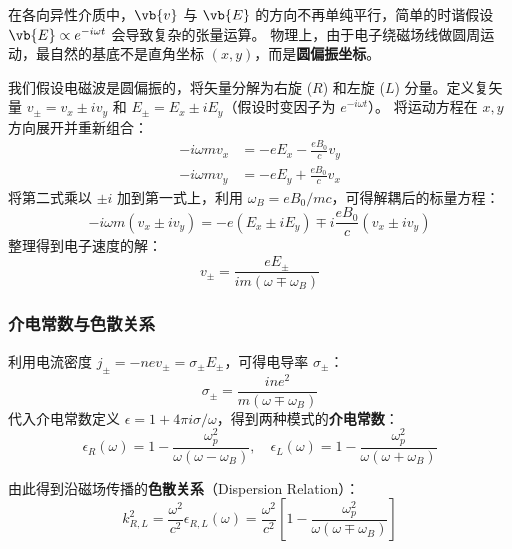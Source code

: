 
在各向异性介质中，$\vb{v}$ 与 $\vb{E}$ 的方向不再单纯平行，简单的时谐假设 $\vb{E} \propto e^{-i\omega t}$ 会导致复杂的张量运算。
物理上，由于电子绕磁场线做圆周运动，最自然的基底不是直角坐标 $(x, y)$，而是\textbf{圆偏振坐标}。

我们假设电磁波是圆偏振的，将矢量分解为右旋 ($R$) 和左旋 ($L$) 分量。定义复矢量 $v_\pm = v_x \pm i v_y$ 和 $E_\pm = E_x \pm i E_y$（假设时变因子为 $e^{-i\omega t}$）。
将运动方程在 $x, y$ 方向展开并重新组合：
\begin{align}
    -i\omega m v_x &= -e E_x - \frac{e B_0}{c} v_y \\
    -i\omega m v_y &= -e E_y + \frac{e B_0}{c} v_x
\end{align}
将第二式乘以 $\pm i$ 加到第一式上，利用 $\omega_B = eB_0/mc$，可得解耦后的标量方程：
\begin{equation}
    -i\omega m (v_x \pm i v_y) = -e (E_x \pm i E_y) \mp i \frac{e B_0}{c} (v_x \pm i v_y)
\end{equation}
整理得到电子速度的解：
\begin{equation}
    v_\pm = \frac{e E_\pm}{i m (\omega \mp \omega_B)}
\end{equation}

\subsubsection{介电常数与色散关系}

利用电流密度 $j_\pm = -n e v_\pm = \sigma_\pm E_\pm$，可得电导率 $\sigma_\pm$：
\begin{equation}
    \sigma_\pm = \frac{i n e^2}{m(\omega \mp \omega_B)}
\end{equation}
代入介电常数定义 $\epsilon = 1 + 4\pi i \sigma / \omega$，得到两种模式的\textbf{介电常数}：
\begin{equation}
    \epsilon_R(\omega) = 1 - \frac{\omega_p^2}{\omega(\omega - \omega_B)}, \quad
    \epsilon_L(\omega) = 1 - \frac{\omega_p^2}{\omega(\omega + \omega_B)}
\end{equation}

由此得到沿磁场传播的\textbf{色散关系}（Dispersion Relation）：
\begin{equation}
    k_{R,L}^2 = \frac{\omega^2}{c^2} \epsilon_{R,L}(\omega) = \frac{\omega^2}{c^2} \left[ 1 - \frac{\omega_p^2}{\omega(\omega \mp \omega_B)} \right]
\end{equation}

